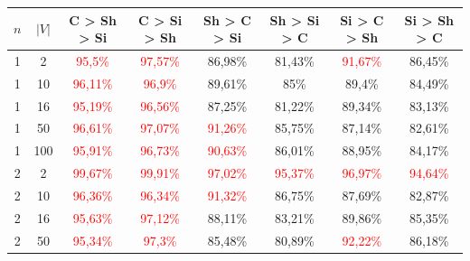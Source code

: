 \begin{table}[ht]
    \centering
    \begin{tabular}{cc|c|c|c|c|c|c}
        \toprule
        $n$ & $|V|$ & \textbf{C > Sh > Si}              & \textbf{C > Si > Sh}              & \textbf{Sh > C > Si}     & \textbf{Sh > Si > C}     & \textbf{Si > C > Sh}     & \textbf{Si > Sh > C}     \\\midrule
        {1} & {2}   & \textcolor{red}{95,5\%}           & \textcolor{red}{97,57\%}          & {86,98\%}                & {81,43\%}                & \textcolor{red}{91,67\%} & {86,45\%}                \\
        {1} & {10}  & \textcolor{red}{96,11\%}          & \textcolor{red}{96,9\%}           & {89,61\%}                & {85\%}                   & {89,4\%}                 & {84,49\%}                \\
        {1} & {16}  & \textcolor{red}{95,19\%}          & \textcolor{red}{96,56\%}          & {87,25\%}                & {81,22\%}                & {89,34\%}                & {83,13\%}                \\
        {1} & {50}  & \textcolor{red}{96,61\%}          & \textcolor{red}{97,07\%}          & \textcolor{red}{91,26\%} & {85,75\%}                & {87,14\%}                & {82,61\%}                \\
        {1} & {100} & \textcolor{red}{95,91\%}          & \textcolor{red}{96,73\%}          & \textcolor{red}{90,63\%} & {86,01\%}                & {88,95\%}                & {84,17\%}                \\
        {2} & {2}   & \textcolor{red}{99,67\%}          & \textcolor{red}{99,91\%}          & \textcolor{red}{97,02\%} & \textcolor{red}{95,37\%} & \textcolor{red}{96,97\%} & \textcolor{red}{94,64\%} \\
        {2} & {10}  & \textcolor{red}{96,36\%}          & \textcolor{red}{96,34\%}          & \textcolor{red}{91,32\%} & {86,75\%}                & {87,69\%}                & {82,87\%}                \\
        {2} & {16}  & \textcolor{red}{95,63\%}          & \textcolor{red}{97,12\%}          & {88,11\%}                & {83,21\%}                & {89,86\%}                & {85,35\%}                \\
        {2} & {50}  & \textcolor{red}{95,34\%}          & \textcolor{red}{97,3\%}           & {85,48\%}                & {80,89\%}                & \textcolor{red}{92,22\%} & {86,18\%}                \\

\end{tabular}
\end{table}
